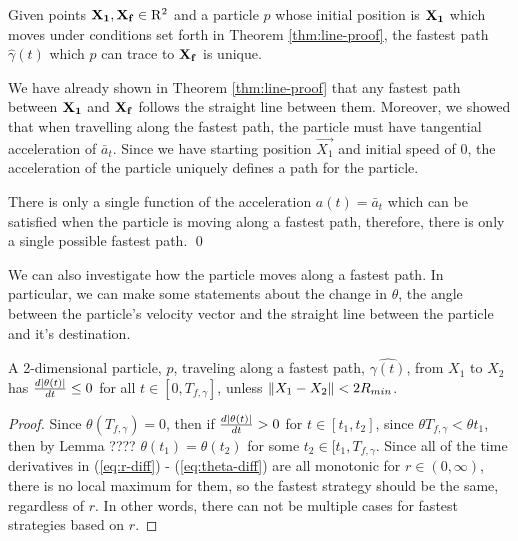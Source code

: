 

\begin{corollary}
  Given points $\mathbf{X_1}, \mathbf{X_f} \in \mathrm{R}^2$ and a particle $p$ whose initial position is $\mathbf{X_1}$ which moves under conditions set forth in Theorem \ref{thm:line-proof}, the fastest path $\hat{\gamma}(t)$ which $p$ can trace to $\mathbf{X_f}$ is unique.
\end{corollary}
\proof We have already shown in Theorem \ref{thm:line-proof} that any fastest path between $\mathbf{X_1}$ and $\mathbf{X_f}$ follows the straight line between them. Moreover, we showed that when travelling along the fastest path, the particle must have tangential acceleration of $\bar{a}_t$. Since we have starting position $\vec{X_1}$ and initial speed of $0$, the acceleration of the particle uniquely defines a path for the particle.

There is only a single function of the acceleration $a(t) = \bar{a}_t$ which can be satisfied when the particle is moving along a fastest path, therefore, there is only a single possible fastest path.
\qed

We can also investigate how the particle moves along a fastest path. In particular, we can make some statements about the change in $\theta$, the angle between the particle's velocity vector and the straight line between the particle and it's destination.


\begin{theorem}
A 2-dimensional particle, $p$, traveling along a fastest path, $\hat{\gamma(t)}$, from $X_1$ to $X_2$ has $\frac{d\abs{\theta(t)}}{dt} \leq 0$ for all $t \in [0, T_{f, \gamma}]$, unless $\norm{X_1 - X_2} < 2 R_{min}$.
\end{theorem}

\begin{proof}
Since $\theta(T_{f,\gamma}) = 0$, then if $\frac{d\abs{\theta(t)}}{dt} > 0$ for $t \in [t_1, t_2]$, since $\theta{T_{f,\gamma}} < \theta{t_1}$, then by Lemma ???? $\theta(t_1) = \theta(t_2)$ for some $t_2 \in [t_1, T_{f, \gamma}$. Since all of the time derivatives in (\ref{eq:r-diff}) - (\ref{eq:theta-diff}) are all monotonic for $r \in (0, \infty)$, there is no local maximum for them, so the fastest strategy should be the same, regardless of $r$. In other words, there can not be multiple cases for fastest strategies based on $r$.
\end{proof}